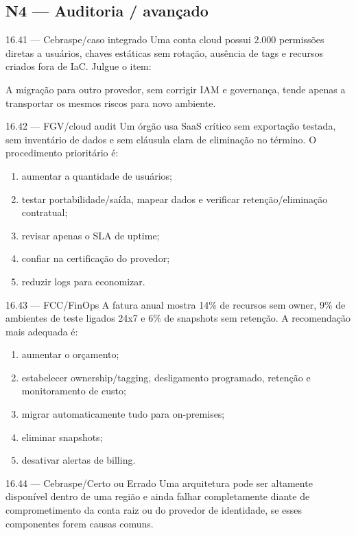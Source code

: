 \subsection*{N4 — Auditoria / avançado}

\begin{questao}{ 16.41 — Cebraspe/caso integrado}
Uma conta cloud possui 2.000 permissões diretas a usuários, chaves estáticas sem rotação, ausência de tags e recursos criados fora de IaC. Julgue o item:

A migração para outro provedor, sem corrigir IAM e governança, tende apenas a transportar os mesmos riscos para novo ambiente.
\end{questao}

\begin{questao}{ 16.42 — FGV/cloud audit}
Um órgão usa SaaS crítico sem exportação testada, sem inventário de dados e sem cláusula clara de eliminação no término. O procedimento prioritário é:
\begin{enumerate}[label=\Alph*)]
\item aumentar a quantidade de usuários;
\item testar portabilidade/saída, mapear dados e verificar retenção/eliminação contratual;
\item revisar apenas o SLA de uptime;
\item confiar na certificação do provedor;
\item reduzir logs para economizar.
\end{enumerate}
\end{questao}

\begin{questao}{ 16.43 — FCC/FinOps}
A fatura anual mostra 14\% de recursos sem owner, 9\% de ambientes de teste ligados 24x7 e 6\% de snapshots sem retenção. A recomendação mais adequada é:
\begin{enumerate}[label=\Alph*)]
\item aumentar o orçamento;
\item estabelecer ownership/tagging, desligamento programado, retenção e monitoramento de custo;
\item migrar automaticamente tudo para on-premises;
\item eliminar snapshots;
\item desativar alertas de billing.
\end{enumerate}
\end{questao}

\begin{questao}{ 16.44 — Cebraspe/Certo ou Errado}
Uma arquitetura pode ser altamente disponível dentro de uma região e ainda falhar completamente diante de comprometimento da conta raiz ou do provedor de identidade, se esses componentes forem causas comuns.
\end{questao}

